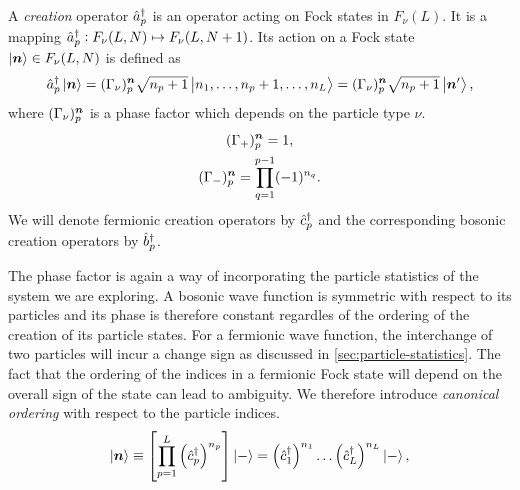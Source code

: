             \begin{definition}
                \label{def:creation_1}
                A \emph{creation} operator $\hat{a}_{p}^{\dagger}$ is an operator acting on
                Fock states in $F_{\nu}(L)$.
                It is a mapping $\hat{a}_{p}^{\dagger}: F_{\nu}(L, N) \mapsto F_{\nu}(L, N +
                1)$.
                Its action on a Fock state $\ket{\boldsymbol{n}} \in F_{\nu}(L, N)$ is
                defined as
                \begin{align}
                    \hat{a}_{p}^{\dagger}\ket{\boldsymbol{n}}
                    = (\Gamma_{\nu})^{\boldsymbol{n}}_{p}
                    \sqrt{n_p + 1}
                    \ket{n_1, \dots, n_p + 1, \dots, n_L}
                    = (\Gamma_{\nu})^{\boldsymbol{n}}_{p}
                    \sqrt{n_p + 1}
                    \ket{\boldsymbol{n}'},
                    \label{eq:general_creation}
                \end{align}
                where $(\Gamma_{\nu})^{\boldsymbol{n}}_{p}$ is a phase factor which
                depends on the particle type $\nu$.
                \begin{gather}
                    (\Gamma_{+})^{\boldsymbol{n}}_{p} = 1, \\
                    (\Gamma_{-})^{\boldsymbol{n}}_{p}
                    = \prod_{q = 1}^{p - 1} (-1)^{n_q}.
                \end{gather}
                We will denote fermionic creation operators by $\hat{c}_{p}^{\dagger}$ and the
                corresponding bosonic creation operators by $\hat{b}_{p}^{\dagger}$.
            \end{definition}
            The phase factor is again a way of incorporating the particle
            statistics of the system we are exploring.
            A bosonic wave function is symmetric with respect to its particles
            and its phase is therefore constant regardles of the ordering of the
            creation of its particle states.
            For a fermionic wave function, the interchange of two particles will
            incur a change sign as discussed in
            \autoref{sec:particle-statistics}.
            The fact that the ordering of the indices in a fermionic Fock state
            will depend on the overall sign of the state can lead to ambiguity.
            We therefore introduce \emph{canonical ordering} with respect to the
            particle indices.
            \begin{align}
                \ket{\boldsymbol{n}}
                \equiv \left[ 
                    \prod_{p = 1}^{L}
                    \left( \hat{c}_{p}^{\dagger} \right)^{n_p}
                 \right]\ket{-}
                = \left( \hat{c}_{1}^{\dagger} \right)^{n_1}\dots\left( \hat{c}_{L}^{\dagger} \right)^{n_L}\ket{-},
                \label{eq:canonical-fock-state}
            \end{align}
